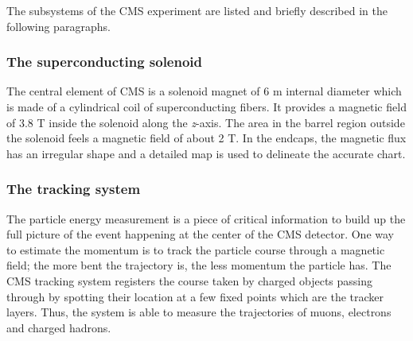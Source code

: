 The subsystems of the CMS experiment are listed and briefly described
in the following paragraphs.

\subsubsection{The superconducting solenoid}
The central element of CMS is a solenoid magnet of 6 m internal diameter
which is made of a cylindrical coil of superconducting fibers. It 
provides a magnetic field of 3.8 T inside the solenoid along the
\emph{z}-axis. The area in the barrel region outside the solenoid
feels a magnetic field of about 2 T.
In the endcaps, the
magnetic flux has an irregular shape and a detailed map is used to
delineate the accurate chart.
\subsubsection{The tracking system}\label{sec:tracking}
The particle energy measurement is a piece of critical information to build up the full
picture of the event happening at the center of the CMS detector. One way to
estimate the momentum is to track the particle course through a
magnetic field; the more bent the trajectory is, the less momentum the
particle has. The CMS tracking system registers the course taken by
charged objects passing through by spotting their location at a few
fixed points which are the tracker layers. 
Thus, the system is able to measure the trajectories of muons,
electrons and
charged hadrons.

